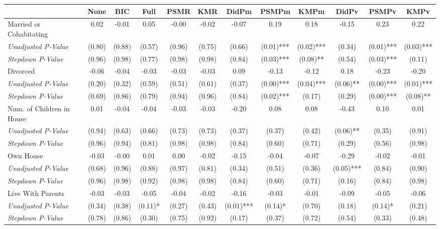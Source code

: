 \begin{tabular}{l c c c c c c c c c c c}
\toprule
 & None & BIC & Full & PSMR & KMR & DidPm & PSMPm & KMPm & DidPv & PSMPv & KMPv \\
\midrule
Married or Cohabitating & 0.02 & -0.01 & 0.05 & -0.00 & -0.02 & -0.07 & 0.19 & 0.18 & -0.15 & 0.23 & 0.22 \\
\quad \textit{Unadjusted P-Value} & (0.80) & (0.88) & (0.57) & (0.96) & (0.75) & (0.66) & (0.01)*** & (0.02)*** & (0.34) & (0.01)*** & (0.03)*** \\
\quad \textit{Stepdown P-Value} & (0.96) & (0.98) & (0.77) & (0.98) & (0.98) & (0.84) & (0.03)*** & (0.08)** & (0.54) & (0.03)*** & (0.11) \\
Divorced & -0.06 & -0.04 & -0.03 & -0.03 & -0.03 & 0.09 & -0.13 & -0.12 & 0.18 & -0.23 & -0.20 \\
\quad \textit{Unadjusted P-Value} & (0.20) & (0.32) & (0.59) & (0.51) & (0.61) & (0.37) & (0.00)*** & (0.04)*** & (0.06)** & (0.00)*** & (0.01)*** \\
\quad \textit{Stepdown P-Value} & (0.69) & (0.86) & (0.79) & (0.94) & (0.96) & (0.84) & (0.02)*** & (0.17) & (0.29) & (0.00)*** & (0.08)** \\
Num. of Children in House & 0.01 & -0.04 & -0.04 & -0.03 & -0.03 & -0.20 & 0.08 & 0.08 & -0.43 & 0.10 & 0.01 \\
\quad \textit{Unadjusted P-Value} & (0.94) & (0.63) & (0.66) & (0.73) & (0.73) & (0.37) & (0.37) & (0.42) & (0.06)** & (0.35) & (0.91) \\
\quad \textit{Stepdown P-Value} & (0.96) & (0.94) & (0.81) & (0.98) & (0.98) & (0.84) & (0.60) & (0.71) & (0.29) & (0.56) & (0.98) \\
Own House & -0.03 & -0.00 & 0.01 & 0.00 & -0.02 & -0.15 & -0.04 & -0.07 & -0.29 & -0.02 & -0.01 \\
\quad \textit{Unadjusted P-Value} & (0.68) & (0.96) & (0.88) & (0.97) & (0.81) & (0.34) & (0.51) & (0.36) & (0.05)*** & (0.84) & (0.90) \\
\quad \textit{Stepdown P-Value} & (0.96) & (0.98) & (0.92) & (0.98) & (0.98) & (0.84) & (0.60) & (0.71) & (0.16) & (0.84) & (0.98) \\
Live With Parents & -0.03 & -0.03 & -0.05 & -0.04 & -0.02 & -0.16 & -0.03 & -0.01 & -0.09 & -0.05 & -0.06 \\
\quad \textit{Unadjusted P-Value} & (0.34) & (0.38) & (0.11)* & (0.27) & (0.43) & (0.01)*** & (0.14)* & (0.70) & (0.18) & (0.14)* & (0.21) \\
\quad \textit{Stepdown P-Value} & (0.78) & (0.86) & (0.30) & (0.75) & (0.92) & (0.17) & (0.37) & (0.72) & (0.54) & (0.33) & (0.48) \\
\bottomrule
\end{tabular}
